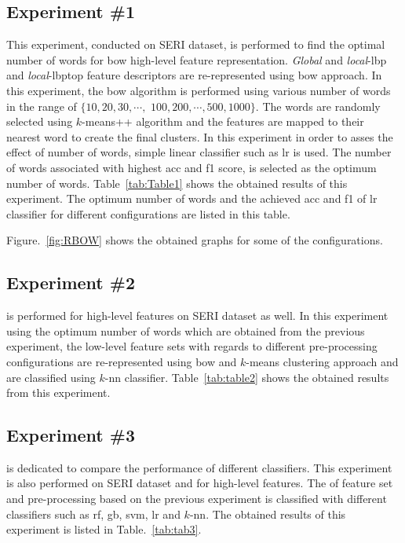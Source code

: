 \subsection{Experiment \#1}
This experiment, conducted on SERI dataset, is performed to find the optimal number of words for \ac{bow} high-level feature representation.
\emph{Global} and \emph{local}-\ac{lbp} and \emph{local}-\ac{lbptop} feature descriptors are re-represented using \ac{bow} approach.
In this experiment, the \ac{bow} algorithm is performed using various number of words in the range of $\{10, 20, 30, \cdots,$
 $100, 200, \cdots, 500, 1000\}$.
The words are randomly selected using $k$-means++ algorithm and the features are mapped to their nearest word to create the final clusters.
In this experiment in order to asses the effect of number of words, simple linear classifier such as \ac{lr} is used.
The number of words associated with highest \ac{acc} and \ac{f1} score, is selected as the optimum number of words.
Table~\ref{tab:Table1} shows the obtained results of this experiment.
The optimum number of words and the achieved \ac{acc} and \ac{f1} of \ac{lr} classifier for different configurations are listed in this table.




Figure.~\ref{fig:RBOW} shows the obtained graphs for some of the configurations. \\

 
\subsection{Experiment \#2}
 is performed for high-level features on SERI dataset as well. 
In this experiment using the optimum number of words which are obtained from the previous experiment, the low-level feature sets with regards to different pre-processing configurations are re-represented using \ac{bow} and $k$-means clustering approach and are classified using $k$-\ac{nn} classifier.
Table~\ref{tab:table2} shows the obtained results from this experiment.\\


\subsection{Experiment \#3}
 is dedicated to compare the performance of different classifiers.
This experiment is also performed on SERI dataset and for high-level features.
The  of feature set and pre-processing based on the previous experiment is classified with different classifiers such as \ac{rf}, \ac{gb}, \ac{svm}, \ac{lr} and $k$-\ac{nn}.
The obtained results of this experiment is listed in Table.~\ref{tab:tab3}.\\


